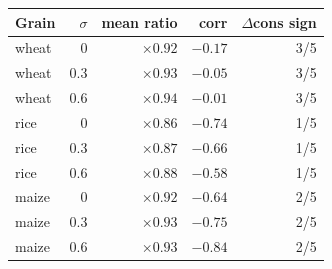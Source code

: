 \begin{tabular}{l r rrr}
\toprule
Grain & \(\sigma\) & mean ratio & corr & \(\Delta\)cons sign \\
\midrule
wheat & 0   & \(\times 0.92\) & $-0.17$ & 3/5 \\
wheat & 0.3 & \(\times 0.93\) & $-0.05$ & 3/5 \\
wheat & 0.6 & \(\times 0.94\) & $-0.01$ & 3/5 \\
\midrule
rice  & 0   & \(\times 0.86\) & $-0.74$ & 1/5 \\
rice  & 0.3 & \(\times 0.87\) & $-0.66$ & 1/5 \\
rice  & 0.6 & \(\times 0.88\) & $-0.58$ & 1/5 \\
\midrule
maize & 0   & \(\times 0.92\) & $-0.64$ & 2/5 \\
maize & 0.3 & \(\times 0.93\) & $-0.75$ & 2/5 \\
maize & 0.6 & \(\times 0.93\) & $-0.84$ & 2/5 \\
\bottomrule
\end{tabular}
